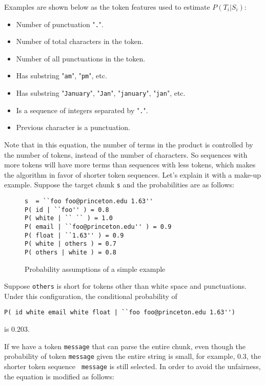 Examples are shown below as the token features used to estimate
$P(T_i|S_i)$:

\begin{itemize}
\item Number of punctuation "{\tt .}".
\item Number of total characters in the token.
\item Number of all punctuations in the token.
\item Has substring "{\tt am}", "{\tt pm}", etc.
\item Has substring "{\tt January}", "{\tt Jan}", "{\tt january}",
"{\tt jan}", etc.
\item Is a sequence of integers separated by "{\tt .}".
\item Previous character is a punctuation.
\end{itemize}

Note that in this equation, the number of terms in the product is
controlled by the number of tokens, instead of the number of
characters. So sequences with more tokens will have more terms than
sequences with less tokens, which makes the algorithm in favor of
shorter token sequences. Let's explain it with a make-up example.
Suppose the target chunk {\tt s} and the probabilities are as
follows:

\begin{figure}[t]
\begin{flushleft}
{\small
\begin{verbatim}
s  = ``foo foo@princeton.edu 1.63''
P( id | ``foo'' ) = 0.8
P( white | `` `` ) = 1.0
P( email | ``foo@princeton.edu'' ) = 0.9
P( float | ``1.63'' ) = 0.9
P( white | others ) = 0.7
P( others | white ) = 0.8
\end{verbatim}
}
\end{flushleft}
\caption{Probability assumptions of a simple example}
\end{figure}

Suppose {\tt others} is short for tokens other than white space and
punctuations. Under this configuration, the conditional probability
of
\begin{verbatim}
P( id white email white float | ``foo foo@princeton.edu 1.63'')
\end{verbatim}
is 0.203.

If we have a token {\tt message} that can parse the entire chunk,
even though the probability of token {\tt message} given the entire
string is small, for example, 0.3, the shorter token sequence {\tt
message} is still selected. In order to avoid the unfairness, the
equation is modified as follows:

